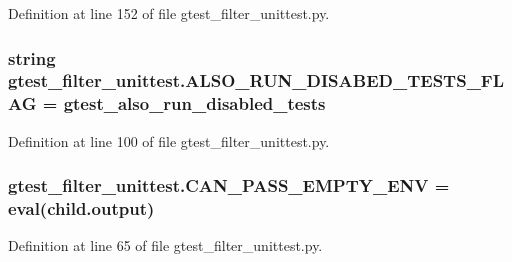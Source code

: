 Definition at line 152 of file gtest\+\_\+filter\+\_\+unittest.\+py.

\subsubsection[{\texorpdfstring{A\+L\+S\+O\+\_\+\+R\+U\+N\+\_\+\+D\+I\+S\+A\+B\+E\+D\+\_\+\+T\+E\+S\+T\+S\+\_\+\+F\+L\+AG}{ALSO_RUN_DISABED_TESTS_FLAG}}]{\setlength{\rightskip}{0pt plus 5cm}string gtest\+\_\+filter\+\_\+unittest.\+A\+L\+S\+O\+\_\+\+R\+U\+N\+\_\+\+D\+I\+S\+A\+B\+E\+D\+\_\+\+T\+E\+S\+T\+S\+\_\+\+F\+L\+AG = \textquotesingle{}gtest\+\_\+also\+\_\+run\+\_\+disabled\+\_\+tests\textquotesingle{}}\hypertarget{namespacegtest__filter__unittest_aa2da713fbaa08fdbaa7cd78c45974edf}{}\label{namespacegtest__filter__unittest_aa2da713fbaa08fdbaa7cd78c45974edf}


Definition at line 100 of file gtest\+\_\+filter\+\_\+unittest.\+py.

\subsubsection[{\texorpdfstring{C\+A\+N\+\_\+\+P\+A\+S\+S\+\_\+\+E\+M\+P\+T\+Y\+\_\+\+E\+NV}{CAN_PASS_EMPTY_ENV}}]{\setlength{\rightskip}{0pt plus 5cm}gtest\+\_\+filter\+\_\+unittest.\+C\+A\+N\+\_\+\+P\+A\+S\+S\+\_\+\+E\+M\+P\+T\+Y\+\_\+\+E\+NV = eval(child.\+output)}\hypertarget{namespacegtest__filter__unittest_a3ac12d5141273a483e2fd6d44ab2eef0}{}\label{namespacegtest__filter__unittest_a3ac12d5141273a483e2fd6d44ab2eef0}


Definition at line 65 of file gtest\+\_\+filter\+\_\+unittest.\+py.

